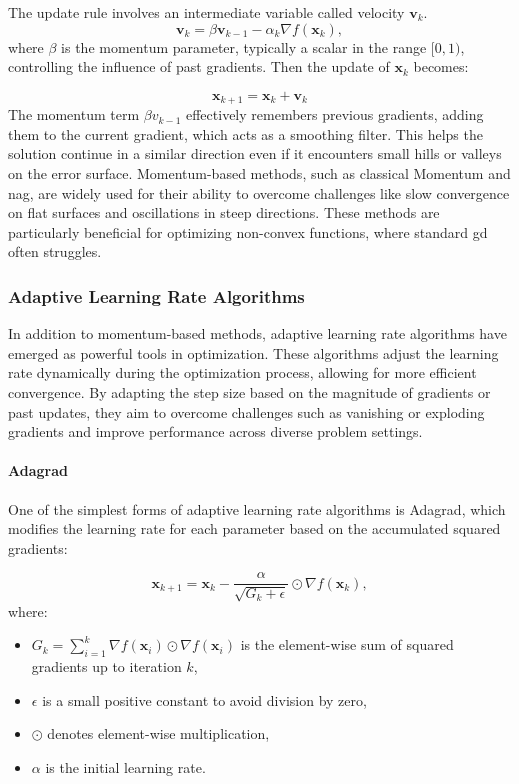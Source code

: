 The update rule involves an intermediate variable called velocity $\mathbf{v}_k$.
\begin{equation}
   \mathbf{v}_k = \beta \mathbf{v}_{k-1} - \alpha_k \nabla f(\mathbf{x}_k),
   \label{eq:momentum_v}
\end{equation}
where $\beta$ is the momentum parameter, typically a scalar in the range \( [0, 1) \), controlling the influence of past gradients. Then the update of $\mathbf{x}_k$ becomes:

\begin{equation}
\mathbf{x}_{k+1} = \mathbf{x}_k + \mathbf{v}_k
\label{eq:momentum_update}
\end{equation}
The momentum term $\beta v_{k-1}$ effectively remembers previous gradients, adding them to the current gradient, which acts as a smoothing filter. This helps the solution continue in a similar direction even if it encounters small hills or valleys on the error surface. Momentum-based methods, such as classical Momentum and \ac{nag}, are widely used for their ability to overcome challenges like slow convergence on flat surfaces and oscillations in steep directions. These methods are particularly beneficial for optimizing non-convex functions, where standard \ac{gd} often struggles.

\subsubsection{Adaptive Learning Rate Algorithms}
\label{subsubsection:adaptive_learning_rates}
In addition to momentum-based methods, adaptive learning rate algorithms have emerged as powerful tools in optimization. These algorithms adjust the learning rate dynamically during the optimization process, allowing for more efficient convergence. By adapting the step size based on the magnitude of gradients or past updates, they aim to overcome challenges such as vanishing or exploding gradients and improve performance across diverse problem settings.

\paragraph{Adagrad}
One of the simplest forms of adaptive learning rate algorithms is Adagrad, which modifies the learning rate for each parameter based on the accumulated squared gradients:

\[
\mathbf{x}_{k+1} = \mathbf{x}_k - \frac{\alpha}{\sqrt{G_k + \epsilon}} \odot \nabla f(\mathbf{x}_k),
\]
where:
\begin{itemize}
    \item \( G_k = \sum_{i=1}^k \nabla f(\mathbf{x}_i) \odot \nabla f(\mathbf{x}_i) \) is the element-wise sum of squared gradients up to iteration \( k \),
    \item \( \epsilon \) is a small positive constant to avoid division by zero,
    \item \( \odot \) denotes element-wise multiplication,
    \item \( \alpha \) is the initial learning rate.
\end{itemize}

